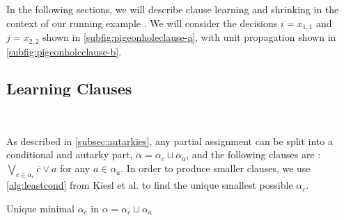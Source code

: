 In the following sections, we will describe \pr clause learning and shrinking in
the context of our running example  . We will consider the decisions $i =
x_{1, 1}$ and $j = x_{2, 2}$ shown in \autoref{subfig:pigeonholeclause-a}, with
unit propagation shown in \autoref{subfig:pigeonholeclause-b}.







\subsection{Learning \pr Clauses}~\label{subsec:learning}


As described in \autoref{subsec:autarkies}, any partial assignment can be split 
into a conditional and autarky part, 
$\alpha = \alpha_c \sqcup \alpha_a$, 
and the following clauses are \pr: $\bigvee_{c \in \alpha_c} \overline{c} \lor a$ for
any $a \in \alpha_a$. 
In order to produce smaller \pr clauses, we use 
\autoref{alg:leastcond} from Kiesl et al.
\cite{conditionalautarkies} to find the unique smallest possible $\alpha_c$.



\begin{algorithm}
    \caption{Unique minimal $\alpha_c$ in $\alpha = \alpha_c \sqcup \alpha_a$}\label{alg:leastcond}
    \SetAlgoNoLine

\end{algorithm}

